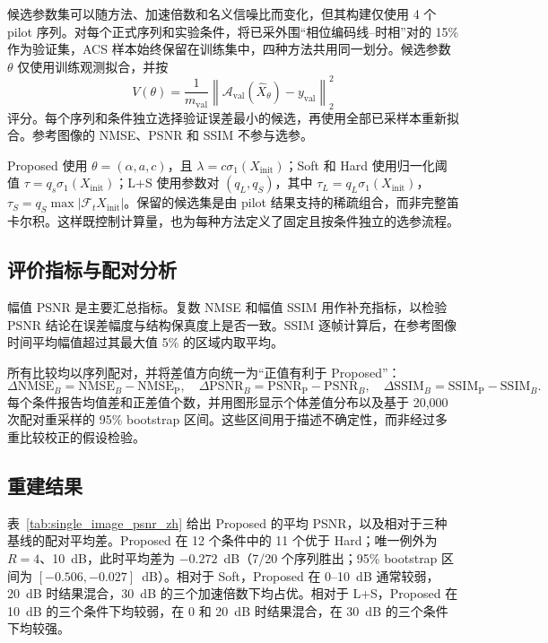 候选参数集可以随方法、加速倍数和名义信噪比而变化，但其构建仅使用 4 个 pilot 序列。对每个正式序列和实验条件，将已采外围“相位编码线--时相”对的 15\% 作为验证集，ACS 样本始终保留在训练集中，四种方法共用同一划分。候选参数 $\theta$ 仅使用训练观测拟合，并按
\begin{equation}
  V(\theta)=\frac{1}{m_{\mathrm{val}}}
  \left\lVert\mathcal A_{\mathrm{val}}(\widehat X_\theta)
  -y_{\mathrm{val}}\right\rVert_2^2
  \label{eq:validation_score_zh}
\end{equation}
评分。每个序列和条件独立选择验证误差最小的候选，再使用全部已采样本重新拟合。参考图像的 NMSE、PSNR 和 SSIM 不参与选参。

Proposed 使用 $\theta=(\alpha,a,c)$，且 $\lambda=c\sigma_1(X_{\mathrm{init}})$；Soft 和 Hard 使用归一化阈值 $\tau=q_s\sigma_1(X_{\mathrm{init}})$；L+S 使用参数对 $(q_L,q_S)$，其中 $\tau_L=q_L\sigma_1(X_{\mathrm{init}})$，$\tau_S=q_S\max|\mathcal F_tX_{\mathrm{init}}|$。保留的候选集是由 pilot 结果支持的稀疏组合，而非完整笛卡尔积。这样既控制计算量，也为每种方法定义了固定且按条件独立的选参流程。

\subsection{评价指标与配对分析}
\label{sec:evaluation_metrics_zh}

幅值 PSNR 是主要汇总指标。复数 NMSE 和幅值 SSIM 用作补充指标，以检验 PSNR 结论在误差幅度与结构保真度上是否一致。SSIM 逐帧计算后，在参考图像时间平均幅值超过其最大值 5\% 的区域内取平均。

所有比较均以序列配对，并将差值方向统一为“正值有利于 Proposed”：
\begin{equation}
  \Delta\mathrm{NMSE}_B=\mathrm{NMSE}_B-\mathrm{NMSE}_{\mathrm{P}},
  \quad
  \Delta\mathrm{PSNR}_B=\mathrm{PSNR}_{\mathrm{P}}-\mathrm{PSNR}_B,
  \quad
  \Delta\mathrm{SSIM}_B=\mathrm{SSIM}_{\mathrm{P}}-\mathrm{SSIM}_B.
  \label{eq:paired_differences_zh}
\end{equation}
每个条件报告均值差和正差值个数，并用图形显示个体差值分布以及基于 20,000 次配对重采样的 95\% bootstrap 区间。这些区间用于描述不确定性，而非经过多重比较校正的假设检验。

\subsection{重建结果}
\label{sec:evaluation_results_zh}

表~\ref{tab:single_image_psnr_zh} 给出 Proposed 的平均 PSNR，以及相对于三种基线的配对平均差。Proposed 在 12 个条件中的 11 个优于 Hard；唯一例外为 $R=4$、10~dB，此时平均差为 $-0.272$~dB（7/20 个序列胜出；95\% bootstrap 区间为 $[-0.506,-0.027]$~dB）。相对于 Soft，Proposed 在 0--10~dB 通常较弱，20~dB 时结果混合，30~dB 的三个加速倍数下均占优。相对于 L+S，Proposed 在 10~dB 的三个条件下均较弱，在 0 和 20~dB 时结果混合，在 30~dB 的三个条件下均较强。

